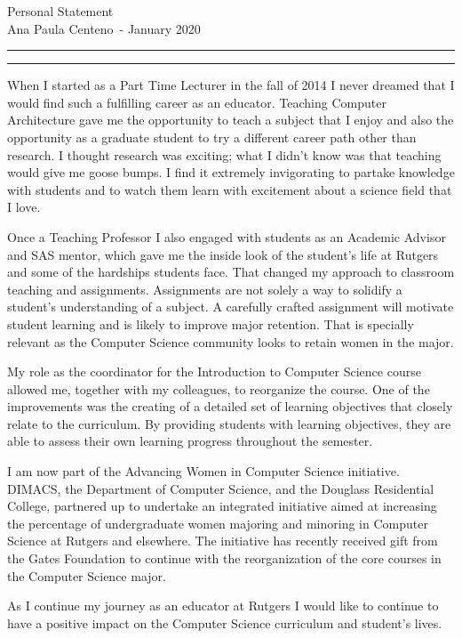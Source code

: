 \documentclass[11pt]{article}
\newcommand{\soptitle}{Personal Statement}
\newcommand{\yourname}{Ana Paula Centeno}
\begin{document}
\begin{center}\LARGE\soptitle\\
\large \yourname\ - January 2020
\end{center}

\hrule
\vspace{1pt}
\hrule height 1pt

\bigskip
\bigskip
When I started as a Part Time Lecturer in the fall of 2014 I never
dreamed that I would find such a fulfilling career as an
educator. Teaching Computer Architecture gave me the opportunity to
teach a subject that I enjoy and also the opportunity as a graduate
student to try a different career path other than research. I thought
research was exciting; what I didn't know was that teaching would give
me goose bumps. I find it extremely invigorating to partake knowledge
with students and to watch them learn with excitement about a science
field that I love.

\bigskip

Once a Teaching Professor I also engaged with students as an Academic
Advisor and SAS mentor, which gave me the inside look of the student's
life at Rutgers and some of the hardships students face. That changed
my approach to classroom teaching and assignments. Assignments are not
solely a way to solidify a student's understanding of a subject. A
carefully crafted assignment will motivate student learning and is
likely to improve major retention. That is specially relevant as the
Computer Science community looks to retain women in the major.

\bigskip

My role as the coordinator for the Introduction to Computer Science
course allowed me, together with my colleagues, to reorganize the
course. One of the improvements was the creating of a detailed set of
learning objectives that closely relate to the curriculum. By
providing students with learning objectives, they are able to assess
their own learning progress throughout the semester.

\bigskip

I am now part of the Advancing Women in Computer Science
initiative. DIMACS, the Department of Computer Science, and the
Douglass Residential College, partnered up to undertake an integrated
initiative aimed at increasing the percentage of undergraduate women
majoring and minoring in Computer Science at Rutgers and
elsewhere. The initiative has recently received gift from the Gates
Foundation to continue with the reorganization of the core courses in
the Computer Science major.

\bigskip

As I continue my journey as an educator at Rutgers I would like to
continue to have a positive impact on the Computer Science curriculum
and student's lives.
\end{document}
